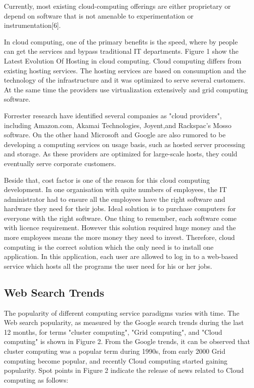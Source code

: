 \documentclass[conference, compsoc]{IEEEtran}
\begin{document}
Currently,  most existing cloud-computing offerings are either proprietary or depend on software that is not amenable to experimentation or instrumentation[6].

In cloud computing, one of the primary benefits is the speed, where by people can get the services and bypass traditional IT departments. Figure 1 show the Latest Evolution Of Hosting in cloud computing. Cloud computing differs from existing hosting services. The hosting services are based on consumption and the technology of the infrastructure and it was optimized to serve several customers. At the same time the providers use virtualization extensively and grid computing software.

Forrester research have identified several companies as "cloud providers", including Amazon.com, Akamai Technologies, Joyent,and Rackspac's Mosso software. On the other hand Microsoft and Google are also rumored to be developing a computing services on usage basis, such as hosted server processing and storage. As these providers are optimized for large-scale hosts, they could eventually serve corporate customers.

Beside that, cost factor is one of the reason for this cloud computing development. In one organisation with quite numbers of employees, the IT administrator had to ensure all the employees have the right software and hardware they need for their jobs. Ideal solution is to purchase computers for everyone with the right software. One thing to remember, each software come with licence requirement. However this solution required huge money and the more employees means the more money they need to invest. Therefore, cloud computing is the correct solution which the only need is to install one application. In this application, each user are allowed to log in to a web-based service which hosts all the programs the user need for his or her jobs. 


\vspace{.5cm}	
\subsection{Web Search Trends}

The popularity of different computing service paradigms varies with time. The Web search popularity, as measured by the Google search trends during the last 12 months, for terms "cluster computing", "Grid computing", and "Cloud computing" is shown in Figure 2. From the Google trends, it can be observed that cluster computing was a popular term during 1990s, from early 2000 Grid computing become popular, and recently Cloud computing started gaining popularity. Spot points in Figure 2 indicate the release of news related to Cloud computing as follows: 
\end{document}
